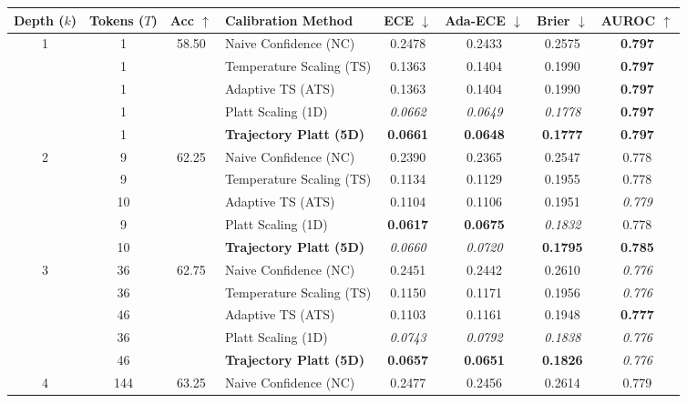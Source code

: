 \begin{table}[t]
\setlength{\tabcolsep}{4pt}
\renewcommand{\arraystretch}{1.05}
\centering
\footnotesize
\begin{tabular}{ccclcccc}
\toprule
\textbf{Depth ($k$)} & \textbf{Tokens ($T$)} & \textbf{Acc} $\uparrow$ & \textbf{Calibration Method} & \textbf{ECE} $\downarrow$ & \textbf{Ada-ECE} $\downarrow$ & \textbf{Brier} $\downarrow$ & \textbf{AUROC} $\uparrow$ \\
\midrule
\multirow{5}{*}{1} & 1 & \multirow{5}{*}{58.50} & Naive Confidence (NC) & 0.2478 & 0.2433 & 0.2575 & \textbf{0.797} \\
 & 1 &  & Temperature Scaling (TS) & 0.1363 & 0.1404 & 0.1990 & \textbf{0.797} \\
 & 1 &  & Adaptive TS (ATS) & 0.1363 & 0.1404 & 0.1990 & \textbf{0.797} \\
 & 1 &  & Platt Scaling (1D) & \textit{0.0662} & \textit{0.0649} & \textit{0.1778} & \textbf{0.797} \\
 & 1 &  & \textbf{Trajectory Platt (5D)} & \textbf{0.0661} & \textbf{0.0648} & \textbf{0.1777} & \textbf{0.797} \\
\midrule
\multirow{5}{*}{2} & 9 & \multirow{5}{*}{62.25} & Naive Confidence (NC) & 0.2390 & 0.2365 & 0.2547 & 0.778 \\
 & 9 &  & Temperature Scaling (TS) & 0.1134 & 0.1129 & 0.1955 & 0.778 \\
 & 10 &  & Adaptive TS (ATS) & 0.1104 & 0.1106 & 0.1951 & \textit{0.779} \\
 & 9 &  & Platt Scaling (1D) & \textbf{0.0617} & \textbf{0.0675} & \textit{0.1832} & 0.778 \\
 & 10 &  & \textbf{Trajectory Platt (5D)} & \textit{0.0660} & \textit{0.0720} & \textbf{0.1795} & \textbf{0.785} \\
\midrule
\multirow{5}{*}{3} & 36 & \multirow{5}{*}{62.75} & Naive Confidence (NC) & 0.2451 & 0.2442 & 0.2610 & \textit{0.776} \\
 & 36 &  & Temperature Scaling (TS) & 0.1150 & 0.1171 & 0.1956 & \textit{0.776} \\
 & 46 &  & Adaptive TS (ATS) & 0.1103 & 0.1161 & 0.1948 & \textbf{0.777} \\
 & 36 &  & Platt Scaling (1D) & \textit{0.0743} & \textit{0.0792} & \textit{0.1838} & \textit{0.776} \\
 & 46 &  & \textbf{Trajectory Platt (5D)} & \textbf{0.0657} & \textbf{0.0651} & \textbf{0.1826} & \textit{0.776} \\
\midrule
\multirow{5}{*}{4} & 144 & \multirow{5}{*}{63.25} & Naive Confidence (NC) & 0.2477 & 0.2456 & 0.2614 & 0.779 \\

\end{tabular}
\end{table}
